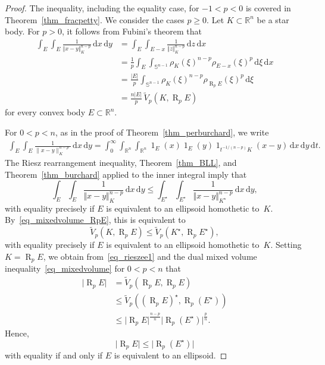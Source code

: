 \documentclass{amsart}
\newcommand{\omr}[1]{\operatorname{R}_{#1}}
\newcommand{\snvtex}{{\mathbb S}^{n-1}}
\newcommand{\dvtex}{\,\mathrm{d}}
\newcommand{\vol}[1]{ \vert #1\vert}
\renewcommand{\chi}{\operatorname{1}}
\begin{document}
\begin{proof}
The inequality, including the equality case, for $-1<p<0$ is covered in
Theorem~\ref{thm_fracpetty}. We consider the cases $p\ge 0$. Let
$K\subset \mathbb R^{n}$ be a star body. For $p>0$, it follows from Fubini's
theorem that
%
\begin{equation}
%
\begin{split} \int _{E} \int _{E} \frac{1}{\Vert x-y\Vert _{K}^{n-p}}
\dvtex x\dvtex y &=\int _{E} \int _{E-x} \frac{1}{\Vert z\Vert _{K}^{n-p}}\dvtex z
\dvtex x
\\
&=\frac{1}{p} \int _{E} \int _{\snvtex} \rho _{K}(\xi )^{n-p} \rho _{E-x}(
\xi )^{p}\dvtex \xi \dvtex x
\\
&=\frac{\vol{E}}{p} \int _{\snvtex} \rho _{K}(\xi )^{n-p} \rho _{\omr {p} E}(
\xi )^{p} \dvtex \xi
\\
&=\frac{n \vol{E}}{p}\, \tilde V_{p}(K,\omr p E)
\label{eq_mixedvolume_RpE}
\end{split}
%
\end{equation}
%
for every convex body $E\subset \mathbb R^{n}$.

For $0<p<n$, as in the proof of Theorem~\ref{thm_perburchard}, we write
%
\begin{multline}
\int _{E}\int _{E} \frac{1}{\|x-y\|^{n-p}_{K}} \dvtex x \dvtex y
= \int _{0}^{\infty }\int _{\mathbb R^{n}}\int _{\mathbb R^{n}} \chi _{E}(x)
\chi _{E}(y) \chi _{t^{- 1/({n-p})}K}(x-y) \dvtex x \dvtex y \dvtex t.
\nonumber \end{multline}
%
The Riesz rearrangement inequality, Theorem~\ref{thm_BLL}, and Theorem~\ref{thm_burchard} applied to the inner integral imply that
%
\begin{equation}
\int _{E} \int _{E} \frac{1}{\Vert x-y\Vert _{K}^{n-p}}\dvtex x\dvtex y\le
\int _{E^{\star}} \int _{E^{\star}}
\frac{1}{\Vert x-y\Vert _{K^{\star}}^{n-p}}\dvtex x\dvtex y,
\nonumber \end{equation}
%
with equality precisely if $E$ is equivalent to an ellipsoid homothetic
to~$K$. By~\eqref{eq_mixedvolume_RpE}, this is equivalent to
%
\begin{equation}
\label{eq_rieszee1}
\tilde V_{p}(K, \omr p E)
\le \tilde V_{p}(K^{\star}, \omr p E^{\star}),
\end{equation}
%
with equality precisely if $E$ is equivalent to an ellipsoid homothetic
to~$K$. Setting $K=\omr p E$, we obtain from~\eqref{eq_rieszee1} and the
dual mixed volume inequality~\eqref{eq_mixedvolume} for $0<p<n$ that
%
\begin{align}
\vol{\omr {p} E} &=\tilde V_{p}(\omr p E, \omr p E)
\nonumber \\
&\le \tilde V_{p}((\omr p E)^{\star}, \omr p (E^{\star}))
\nonumber \\
&\le \vol{\omr p E}^{\frac{n-p}{n}} \vol{\omr p (E^{\star})}^{
\frac {p}{n}}.
\nonumber \end{align}
%
Hence,
%
\begin{equation}
\label{eq_dmv1}
\vol{\omr {p} E}\le \vol{\omr {p} (E^{\star})}
\end{equation}
%
with equality if and only if $E$ is equivalent to an ellipsoid.


\end{proof}
\end{document}
